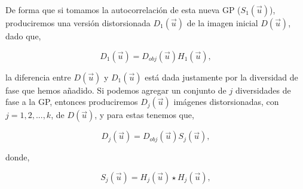 De forma que si tomamos la autocorrelación de esta nueva GP ($S_1(\vec{u})$), produciremos una versión distorsionada $D_1(\vec{u})$ de la imagen inicial $D(\vec{u})$, dado que,

\begin{equation}
	D_1(\vec{u}) = D_{obj}(\vec{u}) H_1(\vec{u}),
\end{equation}

la diferencia entre $D(\vec{u})$ y $D_1(\vec{u})$ está dada justamente por la diversidad de fase que hemos añadido. Si podemos agregar un conjunto de $j$ diversidades de fase a la GP, entonces produciremos $D_{j}(\vec{u})$ imágenes distorsionadas, con $j=1,2,...,k$, de $D(\vec{u})$, y para estas tenemos que,





\begin{equation}
\label{eqD7}
	D_j(\vec{u}) = D_{obj}(\vec{u}) S_j (\vec{u}),
\end{equation}

donde,

\begin{equation}
\label{eqD6}
	S_j(\vec{u}) = H_j(\vec{u}) \star H_j(\vec{u}),
\end{equation}

